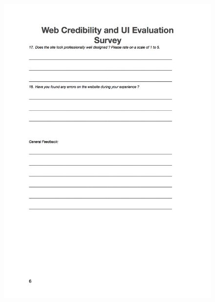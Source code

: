 \begin{figure}[H]
	\centering
	\includegraphics[scale=.7]{chapters/appendices/figures/6.png}
	\label{fig:6/6}
\end{figure}
\newpage

